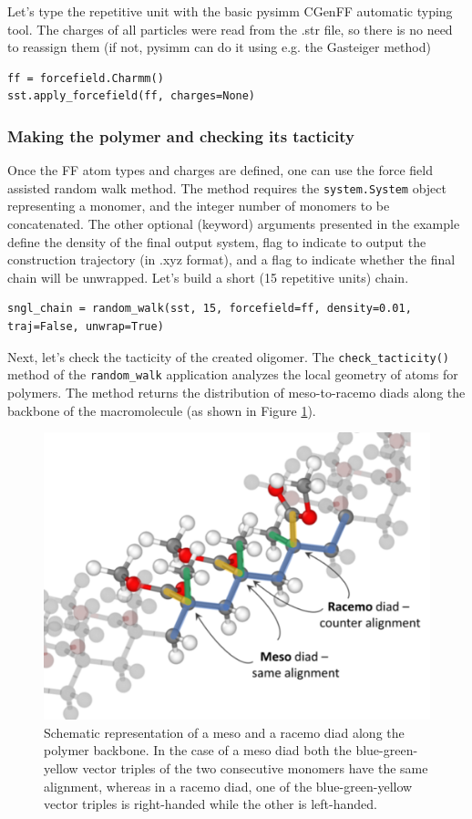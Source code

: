 \documentclass[9pt,tutorial]{livecoms}
\begin{document}
Let's type the repetitive unit with the basic pysimm CGenFF automatic typing tool. The charges of all particles were read from the .str file, so there is no need to reassign them (if not, pysimm can do it using e.g. the Gasteiger method)

\begin{lstlisting}
ff = forcefield.Charmm()
sst.apply_forcefield(ff, charges=None)
\end{lstlisting}


\subsubsection{Making the polymer and checking its tacticity}

Once the FF atom types and charges are defined, one can use the force field assisted random walk method. The method requires the \lstinline$system.System$ object representing a monomer, and the integer number of monomers to be concatenated.  The other optional (keyword) arguments presented in the example define the density of the final output system, flag to indicate to output the construction trajectory (in .xyz format), and a flag to indicate whether the final chain will be unwrapped. Let's build a short (15 repetitive units) chain.

\begin{lstlisting}
sngl_chain = random_walk(sst, 15, forcefield=ff, density=0.01, traj=False, unwrap=True)
\end{lstlisting}

Next, let's check the tacticity of the created oligomer. The \lstinline$check_tacticity()$ method of the \lstinline$random_walk$ application analyzes the local geometry of atoms for polymers. The method returns the distribution of meso-to-racemo diads along the backbone of the macromolecule (as shown in Figure \ref{diads:scheme}).

\begin{figure}[htbp]
  \centering
    \includegraphics[width=0.85\columnwidth]{figures/figure3}
    \caption{Schematic representation of a meso and a racemo diad along the polymer backbone. In the case of a meso diad both the blue-green-yellow vector triples of the two consecutive monomers have the same alignment, whereas in a racemo diad, one of the blue-green-yellow vector triples is right-handed while the other is left-handed.}
    \label{diads:scheme}
\end{figure}
\end{document}
